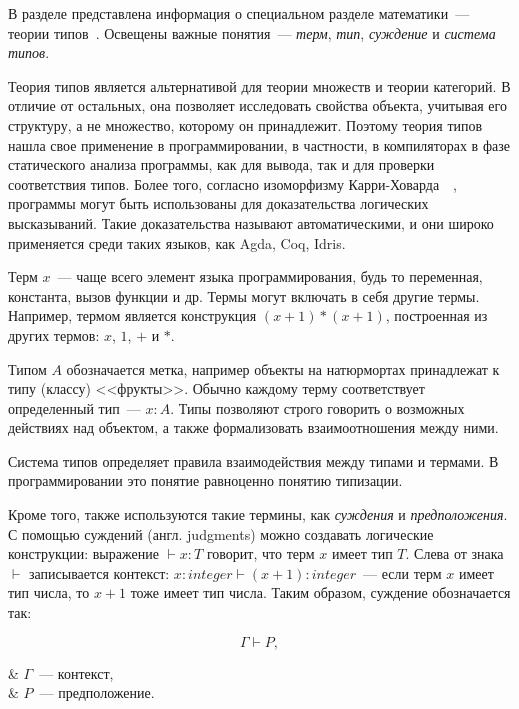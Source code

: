В разделе представлена информация о специальном разделе математики~--- теории типов~\cite{TypeTheoryBook}.
Освещены важные понятия~--- \textit{терм}, \textit{тип}, \textit{суждение} и \textit{система типов}.

Теория типов является альтернативой для теории множеств и теории категорий.
В отличие от остальных, она позволяет исследовать свойства объекта, учитывая его структуру, а не множество, которому он принадлежит.
Поэтому теория типов нашла свое применение в программировании, в частности, в компиляторах в фазе статического анализа программы, как для вывода, так и для проверки соответствия типов.
Более того, согласно изоморфизму Карри-Ховарда~\cite{TypeTheoryArticle}~, программы могут быть использованы для доказательства логических высказываний.
Такие доказательства называют автоматическими, и они широко применяется среди таких языков, как Agda, Coq, Idris.

Терм $x$~--- чаще всего элемент языка программирования, будь то переменная, константа, вызов функции и др.
Термы могут включать в себя другие термы.
Например, термом является конструкция $(x + 1) * (x + 1)$, построенная из других термов: $x$, $1$, $+$ и $*$.

Типом $A$ обозначается метка, например объекты на натюрмортах принадлежат к типу (классу) <<фрукты>>.
Обычно каждому терму соответствует определенный тип~--- $x: A$.
Типы позволяют строго говорить о возможных действиях над объектом, а также формализовать взаимоотношения между ними.

Система типов определяет правила взаимодействия между типами и термами.
В программировании это понятие равноценно понятию типизации.

Кроме того, также используются такие термины, как \textit{суждения} и \textit{предположения}.
С помощью суждений (англ. judgments) можно создавать логические конструкции: выражение $\vdash x: T$ говорит, что терм $x$ имеет тип $T$.
Слева от знака $\vdash$ записывается контекст: $x: integer \vdash (x + 1): integer$~--- если терм $x$ имеет тип числа, то $x + 1$ тоже имеет тип числа.
Таким образом, суждение обозначается так:

\begin{equation}
    \Gamma \vdash P,
    \label{eq:judgment}
\end{equation}
\begin{eqrem}
    & $\Gamma$~--- контекст, \\
    & $P$~--- предположение. \\
\end{eqrem}

